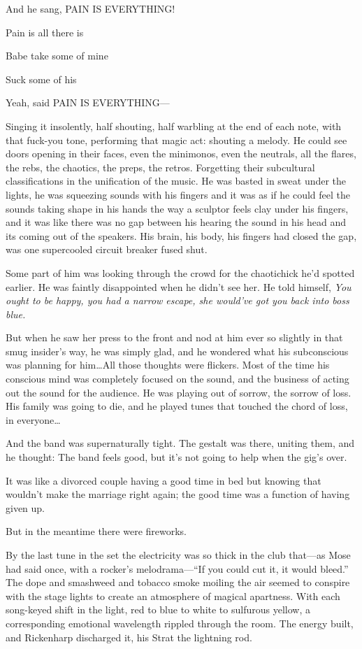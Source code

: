 And he sang, PAIN IS EVERYTHING!

Pain is all there is

Babe take some of mine

Suck some of his

Yeah, said PAIN IS EVERYTHING---

Singing it insolently, half shouting, half warbling at the end of each note, with that fuck-you tone, performing that magic act: shouting a melody. He could see doors opening in their faces, even the minimonos, even the neutrals, all the flares, the rebs, the chaotics, the preps, the retros. Forgetting their subcultural classifications in the unification of the music. He was basted in sweat under the lights, he was squeezing sounds with his fingers and it was as if he could feel the sounds taking shape in his hands the way a sculptor feels clay under his fingers, and it was like there was no gap between his hearing the sound in his head and its coming out of the speakers. His brain, his body, his fingers had closed the gap, was one supercooled circuit breaker fused shut.

Some part of him was looking through the crowd for the chaotichick he'd spotted earlier. He was faintly disappointed when he didn't see her. He told himself, \textit{You ought to be happy, you had a narrow escape, she would've got you back into boss blue.}

But when he saw her press to the front and nod at him ever so slightly in that smug insider's way, he was simply glad, and he wondered what his subconscious was planning for him\ldots All those thoughts were flickers. Most of the time his conscious mind was completely focused on the sound, and the business of acting out the sound for the audience. He was playing out of sorrow, the sorrow of loss. His family was going to die, and he played tunes that touched the chord of loss, in everyone\ldots

And the band was supernaturally tight. The gestalt was there, uniting them, and he thought: The band feels good, but it's not going to help when the gig's over.

It was like a divorced couple having a good time in bed but knowing that wouldn't make the marriage right again; the good time was a function of having given up.

But in the meantime there were fireworks.

By the last tune in the set the electricity was so thick in the club that---as Mose had said once, with a rocker's melodrama---``If you could cut it, it would bleed.'' The dope and smashweed and tobacco smoke moiling the air seemed to conspire with the stage lights to create an atmosphere of magical apartness. With each song-keyed shift in the light, red to blue to white to sulfurous yellow, a corresponding emotional wavelength rippled through the room. The energy built, and Rickenharp discharged it, his Strat the lightning rod.

